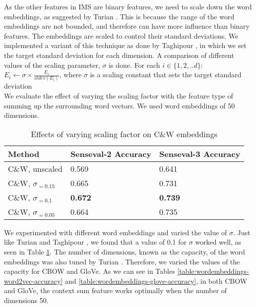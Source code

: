 \documentclass[11pt]{article}
\begin{document}
As the other features in IMS are binary features, we need to scale down the word embeddings, as suggested by Turian . This is because the range of the word embeddings are not bounded, and therefore can have more influence than binary features. The embeddings are scaled to control their standard deviations. We implemented a variant of this technique as done by Taghipour , in which we set the target standard deviation for each dimension. A comparison of different values of the scaling parameter, $\sigma$ is done. For each $i \in \{1, 2, .. d\}$:
\\

$E_{i} \leftarrow \sigma \times \frac{E_{i}}{stdev(E_{i})} $, where $\sigma$ is a scaling constant that sets the target standard deviation
\\ 

We evaluate the effect of varying the scaling factor with the feature type of summing up the surrounding word vectors. We used word embeddings of 50 dimensions.



\begin{table}[ht]
	\caption{Effects of varying scaling factor on C\&W embeddings }
	\label{table:wordembeddings-accuracy}
	\begin{center}
		\begin{tabular}{| p{7cm} | p{4cm} | p{4cm} |}
			\hline
			Method & Senseval-2 Accuracy & Senseval-3 Accuracy \\
			\hline
			C\&W, unscaled & 0.569 & 0.641 \\
			\hline
			C\&W, $\sigma _{=0.15}$ & 0.665 & 0.731 \\
			\hline
			C\&W, $\sigma _{=0.1}$ & {\bf0.672} & {\bf0.739} \\
			\hline
			C\&W, $\sigma _{=0.05}$ & 0.664 & 0.735 \\
			\hline
			
		\end{tabular}
	\end{center}
\end{table}
We experimented with different word embeddings and varied the value of $\sigma$. Just like Turian  and Taghipour , we found that a value of 0.1 for $\sigma$ worked well, as seen in Table \ref{table:wordembeddings-accuracy}. The number of dimensions, known as the capacity, of the word embeddings was also tuned by Turian . Therefore, we varied the values of the capacity for CBOW and GloVe. As we can see in Tables \ref{table:wordembeddings-word2vec-accuracy} and \ref{table:wordembeddings-glove-accuracy}, in both CBOW and GloVe, the context sum feature works optimally when the number of dimensions 50. 
\end{document}
